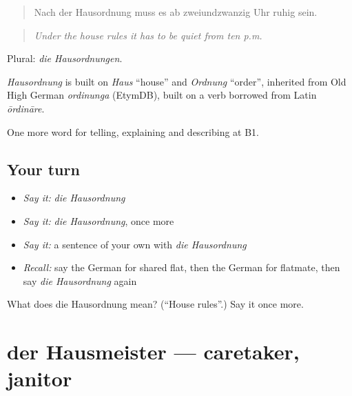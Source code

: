 \begin{quote}
Nach der Hausordnung muss es ab zweiundzwanzig Uhr ruhig sein.
\end{quote}

\begin{quote}
\emph{Under the house rules it has to be quiet from ten p.m.}
\end{quote}

Plural: \emph{die Hausordnungen}.

\begin{cousinweb}
\emph{Hausordnung} is built on \emph{Haus} \textquotedblleft{}house\textquotedblright{} and \emph{Ordnung} \textquotedblleft{}order\textquotedblright{}, inherited from Old High German \emph{ordinunga} (EtymDB), built on a verb borrowed from Latin \emph{ōrdināre}.
\end{cousinweb}

\begin{grammarlens}[title={What you've built}]
One more word for telling, explaining and describing at B1.
\end{grammarlens}

\subsection*{Your turn}
\begin{itemize}
\raggedright
  \item \emph{Say it:} \emph{die Hausordnung}
  \item \emph{Say it:} \emph{die Hausordnung}, once more
  \item \emph{Say it:} a sentence of your own with \emph{die Hausordnung}
  \item \emph{Recall:} say the German for shared flat, then the German for flatmate, then say \emph{die Hausordnung} again
\end{itemize}

\begin{tcolorbox}[breakable,colback=teal!4,colframe=teal!35!black,title={Before you move on}]
What does die Hausordnung mean? (\textquotedblleft{}House rules\textquotedblright{}.) Say it once more.
\end{tcolorbox}
\section[der Hausmeister]{der Hausmeister — caretaker, janitor}

\label{lesson:GE-C532-hausmeister}



